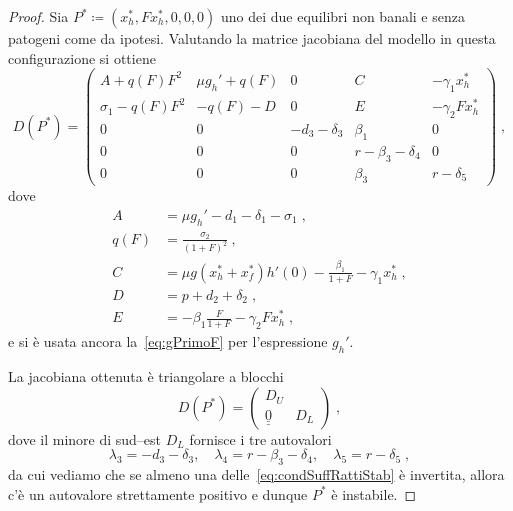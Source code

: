 \begin{proof}
Sia $P^* \coloneq (x_h^*, F x_h^*, 0, 0,0)$ uno dei due equilibri non banali e senza patogeni come da ipotesi.
Valutando la matrice jacobiana del modello in questa configurazione si ottiene
$$D(P^*) =
\begin{pmatrix}
A + q(F) F^2 & \mu g_h' + q(F) & 0 & C & - \gamma_1 x_h^* \\
\sigma_1 -q(F) F^2 & -q(F) -D & 0 & E & - \gamma_2 F x_h^* \\
0 & 0 & -d_3 -\delta_3 & \beta_1 & 0 \\
0 & 0 & 0 & r - \beta_3 -\delta_4 & 0 \\
0 & 0 & 0 & \beta_3 & r -\delta_5
\end{pmatrix} \; ,
$$
dove
\begin{equation}
\begin{split}
A &= \mu g_h' - d_1 -\delta_1 -\sigma_1 \; , \\
q(F) &= \frac{\sigma_2}{(1+F)^2} \: , \\
C &= \mu g(x_h^* + x_f^*) h'(0) - \frac{\beta_1}{1+F} - \gamma_1 x_h^* \; , \\
D &= p + d_2 + \delta_2 \; , \\
E &= -\beta_1 \frac{F}{1+F} -\gamma_2 F x_h^* \; ,
\end{split}
\end{equation}
e si è usata ancora la~\eqref{eq:gPrimoF} per l'espressione $g_h'$.

La jacobiana ottenuta è triangolare a blocchi
$$ D(P^*) =
\begin{pmatrix}
D_U & \\
\underline{\underline{0}} & D_L
\end{pmatrix} \; ,
$$
dove il minore di sud--est $D_L$ fornisce i tre autovalori
\begin{equation}
\lambda_3 = -d_3 -\delta_3 , \quad %
\lambda_4 = r -\beta_3 -\delta_4 , \quad
\lambda_5 = r -\delta_5 \; ,
\label{eq:ultimi3}
\end{equation}
da cui vediamo che se almeno una delle~\eqref{eq:condSuffRattiStab} è invertita, allora c'è un autovalore
strettamente positivo e dunque $P^*$ è instabile.


\end{proof}
